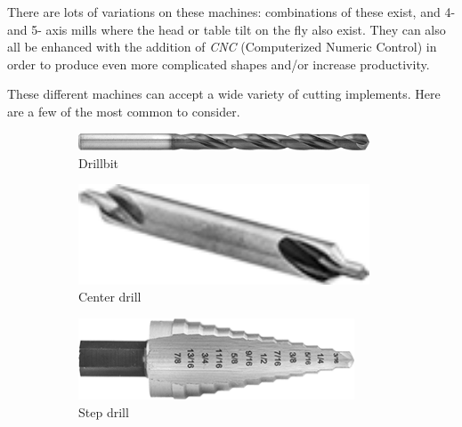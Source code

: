   There are lots of variations on these machines: combinations of these exist, and 4- and 5- axis mills where the head or table tilt on the fly also exist. They can also all be enhanced with the addition of \textit{CNC} (Computerized Numeric Control) in order to produce even more complicated shapes and/or increase productivity.
  
 These different machines can accept a wide variety of cutting implements. Here are a few of the most common to consider.
 
 \begin{figure}[H]
	\begin{subfigure}[b]{.19\linewidth}
		\includegraphics[width=0.95\textwidth,angle=-17]{imgs/drillbit.png}
		\caption{Drillbit}
	\end{subfigure} \begin{subfigure}[b]{.19\linewidth}
		\includegraphics[width=0.95\textwidth]{imgs/centerdrill.png}
		\caption{Center drill}
	\end{subfigure} \begin{subfigure}[b]{.19\linewidth}
		\includegraphics[width=0.9\textwidth,angle=-17]{imgs/step_drill.png}
		\caption{Step drill}
	\end{subfigure}\begin{subfigure}[b]{.19\linewidth}

\end{subfigure}
\end{figure}
